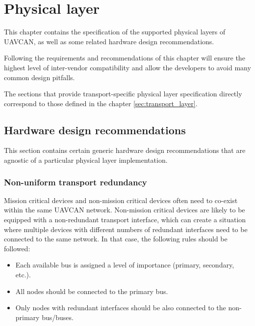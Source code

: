 \chapter{Physical layer}\label{sec:physical_layer}

This chapter contains the specification of the supported physical layers of UAVCAN,
as well as some related hardware design recommendations.

Following the requirements and recommendations of this chapter will ensure the highest level of
inter-vendor compatibility and allow the developers to avoid many common design pitfalls.

The sections that provide transport-specific physical layer specification
directly correspond to those defined in the chapter \ref{sec:transport_layer}.

\clearpage

\clearpage
\section{Hardware design recommendations}

This section contains certain generic hardware design recommendations that are agnostic of a particular
physical layer implementation.

\subsection{Non-uniform transport redundancy}\label{sec:phy_non_uniform_transport_redundancy}

Mission critical devices and non-mission critical devices often need to co-exist within the same UAVCAN network.
Non-mission critical devices are likely to be equipped with a non-redundant transport interface,
which can create a situation where multiple devices with different numbers of redundant interfaces
need to be connected to the same network.
In that case, the following rules should be followed:

\begin{itemize}
    \item Each available bus is assigned a level of importance (primary, secondary, etc.).
    \item All nodes should be connected to the primary bus.
    \item Only nodes with redundant interfaces should be also connected to the non-primary bus/buses.
\end{itemize}

